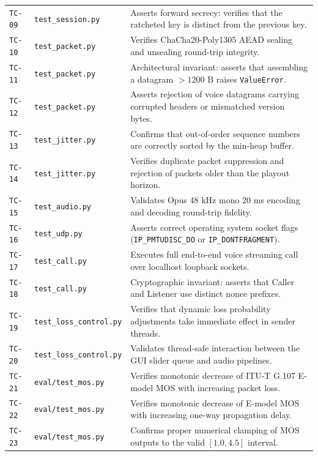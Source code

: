 \begin{table}[htbp]
\begin{tabularx}{\textwidth}{l l p{8.5cm}}
        \texttt{TC-09} & \texttt{test\_session.py} & Asserts forward secrecy: verifies that the ratcheted key is distinct from the previous key. \\
        \texttt{TC-10} & \texttt{test\_packet.py} & Verifies ChaCha20-Poly1305 AEAD sealing and unsealing round-trip integrity. \\
        \texttt{TC-11} & \texttt{test\_packet.py} & Architectural invariant: asserts that assembling a datagram $>1200\text{ B}$ raises \texttt{ValueError}. \\
        \texttt{TC-12} & \texttt{test\_packet.py} & Asserts rejection of voice datagrams carrying corrupted headers or mismatched version bytes. \\
        \texttt{TC-13} & \texttt{test\_jitter.py} & Confirms that out-of-order sequence numbers are correctly sorted by the min-heap buffer. \\
        \texttt{TC-14} & \texttt{test\_jitter.py} & Verifies duplicate packet suppression and rejection of packets older than the playout horizon. \\
        \texttt{TC-15} & \texttt{test\_audio.py} & Validates Opus 48 kHz mono 20 ms encoding and decoding round-trip fidelity. \\
        \texttt{TC-16} & \texttt{test\_udp.py} & Asserts correct operating system socket flags (\texttt{IP\_PMTUDISC\_DO} or \texttt{IP\_DONTFRAGMENT}). \\
        \texttt{TC-17} & \texttt{test\_call.py} & Executes full end-to-end voice streaming call over localhost loopback sockets. \\
        \texttt{TC-18} & \texttt{test\_call.py} & Cryptographic invariant: asserts that Caller and Listener use distinct nonce prefixes. \\
        \texttt{TC-19} & \texttt{test\_loss\_control.py} & Verifies that dynamic loss probability adjustments take immediate effect in sender threads. \\
        \texttt{TC-20} & \texttt{test\_loss\_control.py} & Validates thread-safe interaction between the GUI slider queue and audio pipelines. \\
        \texttt{TC-21} & \texttt{eval/test\_mos.py} & Verifies monotonic decrease of ITU-T G.107 E-model MOS with increasing packet loss. \\
        \texttt{TC-22} & \texttt{eval/test\_mos.py} & Verifies monotonic decrease of E-model MOS with increasing one-way propagation delay. \\
        \texttt{TC-23} & \texttt{eval/test\_mos.py} & Confirms proper numerical clamping of MOS outputs to the valid $[1.0, 4.5]$ interval. \\

\end{tabularx}
\end{table}
